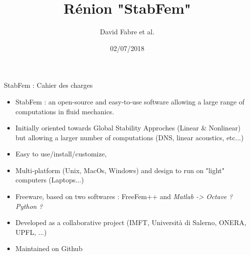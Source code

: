 \documentclass[10pt,blue,hyperref={pdfpagemode=FullScreen}]{beamer}
\title[]{ Rénion "StabFem" }
\author[D. Fabre]{David Fabre et al.}
\date{\vspace{1.cm} 02/07/2018}
\begin{document}


\frame{
\titlepage
}






\begin{frame}{StabFem : Cahier des charges }

\begin{itemize}[<+->]

\item StabFem : an open-source and easy-to-use software allowing a large range of computations in fluid mechanics.

\item Initially  oriented towards Global Stability Approches (Linear \& Nonlinear) but allowing a larger number of computations
(DNS, linear acoustics, etc...)

\item Easy to use/install/customize, 

\item Multi-platform (Unix, MacOs, Windows) and design to run on "light" computers (Laptops...)

\item Freeware, based on two softwares : FreeFem++ and \sl{Matlab} -> Octave ? Python ?

\item Developed as a collaborative project
(IMFT, Università di Salerno, ONERA, UPFL, ...)

\item Maintained on Github

\end{itemize}

\end{frame}
\end{document}
